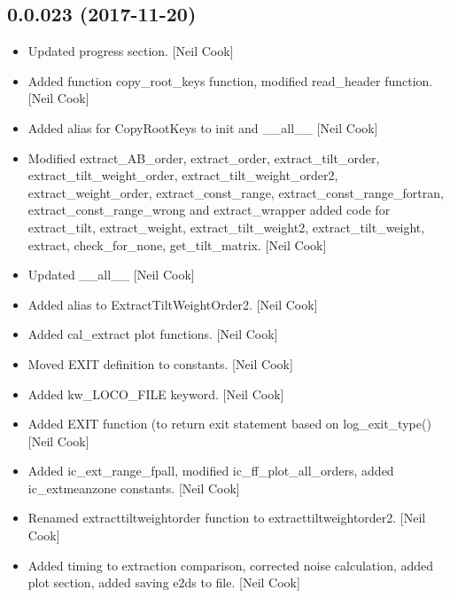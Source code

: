 \documentclass[a4paper,10pt,english]{report}
\begin{document}
\subsection{0.0.023 (2017-11-20)}
\label{\detokenize{misc/changelog:id527}}\begin{itemize}
\item {} 
Updated progress section. {[}Neil Cook{]}

\item {} 
Added function copy\_root\_keys function, modified read\_header function.
{[}Neil Cook{]}

\item {} 
Added alias for CopyRootKeys to init and \_\_all\_\_ {[}Neil Cook{]}

\item {} 
Modified extract\_AB\_order, extract\_order, extract\_tilt\_order,
extract\_tilt\_weight\_order, extract\_tilt\_weight\_order2,
extract\_weight\_order, extract\_const\_range,
extract\_const\_range\_fortran, extract\_const\_range\_wrong and
extract\_wrapper added code for extract\_tilt, extract\_weight,
extract\_tilt\_weight2, extract\_tilt\_weight, extract, check\_for\_none,
get\_tilt\_matrix. {[}Neil Cook{]}

\item {} 
Updated \_\_all\_\_ {[}Neil Cook{]}

\item {} 
Added alias to ExtractTiltWeightOrder2. {[}Neil Cook{]}

\item {} 
Added cal\_extract plot functions. {[}Neil Cook{]}

\item {} 
Moved EXIT definition to constants. {[}Neil Cook{]}

\item {} 
Added kw\_LOCO\_FILE keyword. {[}Neil Cook{]}

\item {} 
Added EXIT function (to return exit statement based on log\_exit\_type()
{[}Neil Cook{]}

\item {} 
Added ic\_ext\_range\_fpall, modified ic\_ff\_plot\_all\_orders, added
ic\_extmeanzone constants. {[}Neil Cook{]}

\item {} 
Renamed extracttiltweightorder function to extracttiltweightorder2.
{[}Neil Cook{]}

\item {} 
Added timing to extraction comparison, corrected noise calculation,
added plot section, added saving e2ds to file. {[}Neil Cook{]}

\end{itemize}
\end{document}
